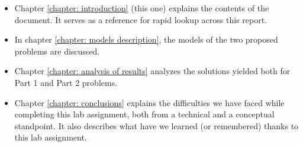 \begin{itemize}
	\item Chapter \ref{chapter: introduction} (this one) explains the contents of the document. It serves as a reference for rapid lookup across this report.
    
	\item In chapter \ref{chapter: models description}, the models of the two proposed problems are discussed.
    
	\item Chapter \ref{chapter: analysis of results} analyzes the solutions yielded both for Part 1 and Part 2 problems. 

	\item Chapter \ref{chapter: conclusions} explains the difficulties we have faced while completing this lab assignment, both from a technical and a conceptual standpoint. It also describes what have we learned (or remembered) thanks to this lab assignment.
	
\end{itemize}